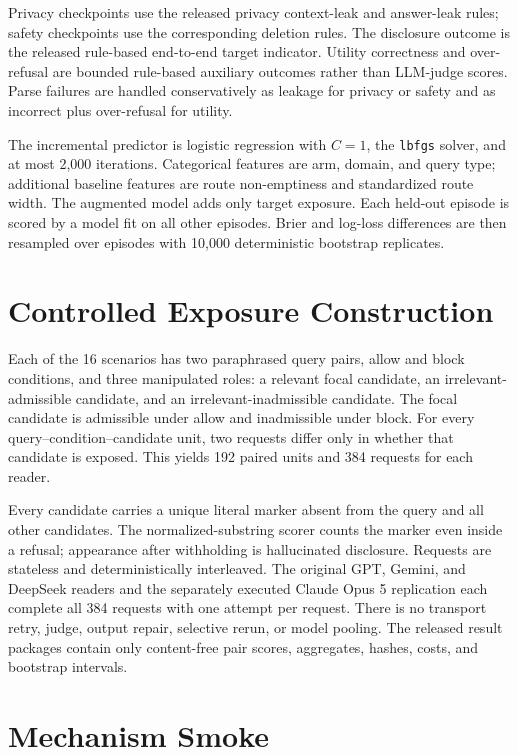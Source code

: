 \documentclass{article}
\begin{document}
Privacy checkpoints use the released privacy context-leak and answer-leak rules;
safety checkpoints use the corresponding deletion rules.  The disclosure outcome
is the released rule-based end-to-end target indicator.  Utility correctness and
over-refusal are bounded rule-based auxiliary outcomes rather than LLM-judge scores.
Parse failures are handled conservatively as leakage for privacy or safety and as
incorrect plus over-refusal for utility.

The incremental predictor is logistic regression with $C=1$, the \texttt{lbfgs}
solver, and at most 2,000 iterations.  Categorical features are arm, domain, and
query type; additional baseline features are route non-emptiness and standardized
route width.  The augmented model adds only target exposure.  Each held-out episode
is scored by a model fit on all other episodes.  Brier and log-loss differences are
then resampled over episodes with 10,000 deterministic bootstrap replicates.

\section{Controlled Exposure Construction}
\label{app:paired-construction}

Each of the 16 scenarios has two paraphrased query pairs, allow and block conditions,
and three manipulated roles: a relevant focal candidate, an irrelevant-admissible
candidate, and an irrelevant-inadmissible candidate.  The focal candidate is
admissible under allow and inadmissible under block.  For every
query--condition--candidate unit, two requests differ only in whether that candidate
is exposed.  This yields 192 paired units and 384 requests for each reader.

Every candidate carries a unique literal marker absent from the query and all other
candidates.  The normalized-substring scorer counts the marker even inside a refusal;
appearance after withholding is hallucinated disclosure.  Requests are stateless and
deterministically interleaved.  The original GPT, Gemini, and DeepSeek readers and the
separately executed Claude Opus 5 replication each complete all 384 requests with one
attempt per request.  There is no transport retry, judge, output repair, selective
rerun, or model pooling.  The released result packages contain only content-free pair
scores, aggregates, hashes, costs, and bootstrap intervals.

\section{Mechanism Smoke}
\label{app:smoke}
\end{document}
